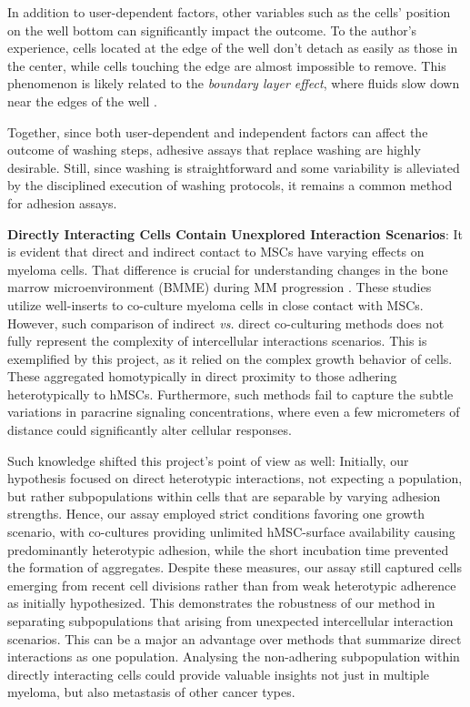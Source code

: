 In addition to user-dependent factors, other variables such as the cells'
position on the well bottom can significantly impact the outcome. To the
author's experience, cells located at the edge of the well don't detach as
easily as those in the center, while cells touching the edge are almost
impossible to remove. This phenomenon is likely related to the \textit{boundary
    layer effect}, where fluids slow down near the edges of the well
\cite{weyburneNewThicknessShape2014}.

Together, since both user-dependent and independent factors can affect the
outcome of washing steps, adhesive assays that replace washing are highly
desirable. Still, since washing is straightforward and some variability is
alleviated by the disciplined execution of washing protocols, it remains a
common method for adhesion assays.



\textbf{Directly Interacting Cells Contain Unexplored Interaction Scenarios}: It
is evident that direct and indirect contact to \acp{MSC} have varying effects on
myeloma cells. That difference is crucial for understanding changes in the bone
marrow microenvironment (BMME) during MM progression
\cite{fairfieldMultipleMyelomaCells2020, dziadowiczBoneMarrowStromaInduced2022}.
These studies utilize well-inserts to co-culture myeloma cells in close
 contact with MSCs. However, such comparison of
indirect \textit{vs.} direct co-culturing methods does not fully represent the
complexity of intercellular interactions scenarios. This is exemplified by this
project, as it relied on the complex growth behavior of \INA cells. These
aggregated homotypically in direct proximity to those adhering heterotypically
to \acp{hMSC}. Furthermore, such methods fail to capture the subtle variations
in paracrine signaling concentrations, where even a few micrometers of distance
could significantly alter cellular responses.

Such knowledge shifted this project's point of view as well: Initially, our
hypothesis focused on direct heterotypic interactions, not expecting a \nMAina
population, but rather subpopulations within \MAina cells that are separable by
varying adhesion strengths. Hence, our assay employed strict conditions favoring
one growth scenario, with co-cultures providing unlimited hMSC-surface
availability causing predominantly heterotypic adhesion, while the short
incubation time prevented the formation of aggregates. Despite these measures,
our assay still captured cells emerging from recent cell divisions rather than
from weak heterotypic adherence as initially hypothesized. This demonstrates the
robustness of our method in separating subpopulations that arising from unexpected
intercellular interaction scenarios. This can be a major an advantage over
methods that summarize direct interactions as one population. Analysing the
non-adhering subpopulation within directly interacting cells could provide
valuable insights not just in multiple myeloma, but also metastasis of other
cancer types.


